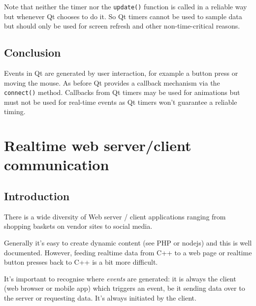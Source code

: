 \documentclass[12pt]{report}
\begin{document}
Note that neither the timer nor the \texttt{update()} function
is called in a reliable way but whenever Qt chooses to do it.
So Qt timers cannot be used to sample data but should
only be used for screen refresh and other non-time-critical
reasons.

\section{Conclusion}
Events in Qt are generated by user interaction, for example a button
press or moving the mouse. As before Qt provides a callback mechanism
via the \texttt{connect()} method. Callbacks from Qt timers may be used for
animations but must not be used for real-time events as Qt timers won't
guarantee a reliable timing.




\chapter{Realtime web server/client communication}

\section{Introduction}

There is a wide diversity of Web server / client applications
ranging from shopping baskets on vendor sites to social
media.

Generally it's easy to create dynamic content (see PHP or nodejs) and this is well
documented. However, feeding realtime data from C++ to a web page or
realtime button presses back to C++ is a bit more difficult.

It's important to recognise where \textsl{events} are generated: it is
always the client (web browser or mobile app) which triggers an event,
be it sending data over to the server or requesting data. It's
always initiated by the client.
\end{document}
